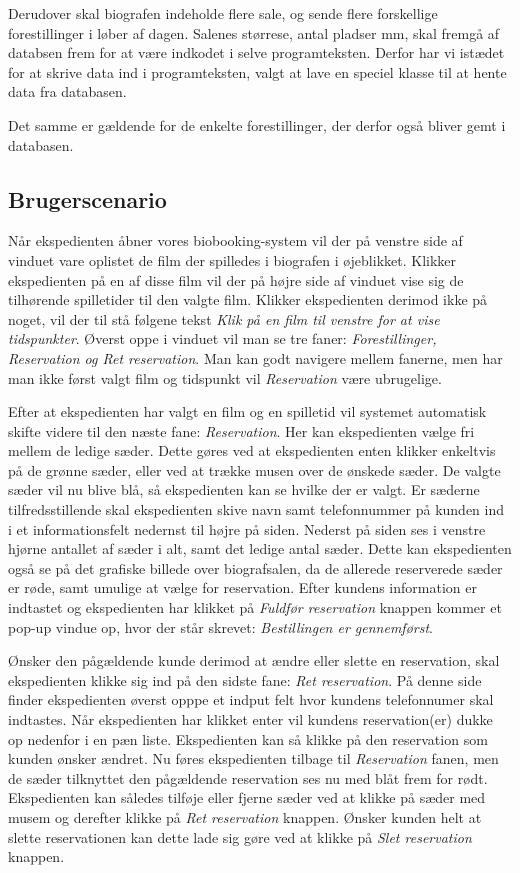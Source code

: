 \documentclass[final]{rapport1}
\begin{document}
Derudover skal biografen indeholde flere sale, og sende flere forskellige forestillinger i løber af dagen. Salenes størrese, antal pladser mm, skal fremgå af databsen frem for at være indkodet i selve programteksten. Derfor har vi istædet for at skrive data ind i programteksten, valgt at lave en speciel klasse til at hente data fra databasen. 

Det samme er gældende for de enkelte forestillinger, der derfor også bliver gemt i databasen.

\subsection{Brugerscenario}
Når ekspedienten åbner vores biobooking-system vil der på venstre side af vinduet vare oplistet de film der spilledes i biografen i øjeblikket. Klikker ekspedienten på en af disse film vil der på højre side af vinduet vise sig de tilhørende spilletider til den valgte film. Klikker ekspedienten derimod ikke på noget, vil der til stå følgene tekst \emph{Klik på en film til venstre for at vise tidspunkter}. Øverst oppe i vinduet vil man se tre faner: \emph{Forestillinger, Reservation og Ret reservation}. Man kan godt navigere mellem fanerne, men har man ikke først valgt film og tidspunkt vil \emph{Reservation} være ubrugelige.
 
Efter at ekspedienten har valgt en film og en spilletid vil systemet automatisk skifte videre til den næste fane: \emph{Reservation}. Her kan ekspedienten vælge fri mellem de ledige sæder. Dette gøres ved at ekspedienten enten klikker enkeltvis på de grønne sæder, eller ved at trække musen over de ønskede sæder. De valgte sæder vil nu blive blå, så ekspedienten kan se hvilke der er valgt. Er sæderne tilfredsstillende skal ekspedienten skive navn samt telefonnummer på kunden ind i et informationsfelt nedernst til højre på siden. Nederst på siden ses i venstre hjørne antallet af sæder i alt, samt det ledige antal sæder. Dette kan ekspedienten også se på det grafiske billede over biografsalen, da de allerede reserverede sæder er røde, samt umulige at vælge for reservation. Efter kundens information er indtastet og ekspedienten har klikket på \emph{Fuldfør reservation} knappen kommer et pop-up vindue op, hvor der står skrevet: \emph{Bestillingen er gennemførst}.

Ønsker den pågældende kunde derimod at ændre eller slette en reservation, skal ekspedienten klikke sig ind på den sidste fane: \emph{Ret reservation}. På denne side finder ekspedienten øverst opppe et indput felt hvor kundens telefonnumer skal indtastes. Når ekspedienten har klikket enter vil kundens reservation(er) dukke op nedenfor i en pæn liste. Ekspedienten kan så klikke på den reservation som kunden ønsker ændret. Nu føres ekspedienten tilbage til \emph{Reservation} fanen, men de sæder tilknyttet den pågældende reservation ses nu med blåt frem for rødt. Ekspedienten kan således tilføje eller fjerne sæder ved at klikke på sæder med musem og derefter klikke på \emph{Ret reservation} knappen. Ønsker kunden helt at slette reservationen kan dette lade sig gøre ved at klikke på \emph{Slet reservation} knappen. 
\end{document}
